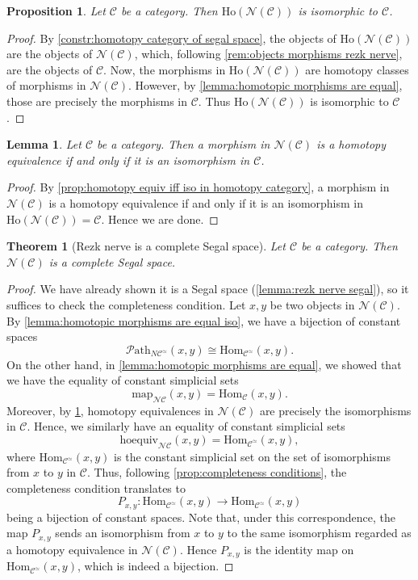 \documentclass[11pt, a4paper]{amsart}
\newcommand{\cC}{\mathcal{C}}
\newcommand{\sN}{\mathscr{N}}
\newcommand{\Hom}{\mathrm{Hom}}
\newcommand{\map}{\mathrm{map}}
\newcommand{\Ho}{\mathrm{Ho}}
\newcommand{\hoequiv}{\mathrm{hoequiv}}
\newcommand{\Path}{\mathscr{P}\mathrm{ath}}
\newtheorem{theorem}[equation]{Theorem}
\newtheorem{lemma}[equation]{Lemma}
\newtheorem{proposition}[equation]{Proposition}
\theoremstyle{definition}
\theoremstyle{remark}
\numberwithin{equation}{section}
\begin{document}
\begin{proposition}
  Let $\cC$ be a category. Then $\Ho(\sN(\cC))$ is isomorphic to $\cC$.
\end{proposition}

\begin{proof}
  By \cref{constr:homotopy category of segal space}, the objects of $\Ho(\sN(\cC))$ are the objects of $\sN(\cC)$, which, following \cref{rem:objects morphisms rezk nerve}, are the objects of $\cC$. Now, the morphisms in $\Ho(\sN(\cC))$ are homotopy classes of morphisms in $\sN(\cC)$. However, by \cref{lemma:homotopic morphisms are equal}, those are precisely the morphisms in $\cC$. Thus $\Ho(\sN(\cC))$ is isomorphic to $\cC$.
\end{proof}

\begin{lemma} \label{lemma:equivalences in rezk nerve}
  Let $\cC$ be a category. Then a morphism in $\sN(\cC)$ is a homotopy equivalence if and only if it is an isomorphism in $\cC$.
\end{lemma}

\begin{proof}
 By \cref{prop:homotopy equiv iff iso in homotopy category}, a morphism in $\sN(\cC)$ is a homotopy equivalence if and only if it is an isomorphism in $\Ho(\sN(\cC)) = \cC$. Hence we are done.
\end{proof}

\begin{theorem}[Rezk nerve is a complete Segal space]
  Let $\cC$ be a category. Then $\sN(\cC)$ is a complete Segal space.
\end{theorem}

\begin{proof}
  We have already shown it is a Segal space (\cref{lemma:rezk nerve segal}), so it suffices to check the completeness condition.   Let $x,y$ be two objects in $\sN(\cC)$. By \cref{lemma:homotopic morphisms are equal iso}, we have a bijection of constant spaces
  \[\Path_{N\cC^\simeq}(x,y) \cong \Hom_{\cC^\simeq}(x,y).\]
  On the other hand, in \cref{lemma:homotopic morphisms are equal}, we showed that we have the equality of constant simplicial sets
  \[\map_{\sN\cC}(x,y) = \Hom_{\cC}(x,y). \]
  Moreover, by \cref{lemma:equivalences in rezk nerve}, homotopy equivalences in $\sN(\cC)$ are precisely the isomorphisms in $\cC$. Hence, we similarly have an equality of constant simplicial sets 
   \[\hoequiv_{\sN\cC}(x,y) = \Hom_{\cC^\simeq}(x,y),\]
   where $\Hom_{\cC^\simeq}(x,y)$ is the constant simplicial set on the set of isomorphisms from $x$ to $y$ in $\cC$. Thus, following \cref{prop:completeness conditions}, the completeness condition translates to 
   \[P_{x,y}\colon\Hom_{\cC^\simeq}(x,y) \to \Hom_{\cC^\simeq}(x,y)\]
    being a bijection of constant spaces. Note that, under this correspondence, the map \(P_{x,y}\) sends an isomorphism from $x$ to $y$ to the same isomorphism regarded as a homotopy equivalence in $\sN(\cC)$. Hence $P_{x,y}$ is the identity map on \(\Hom_{\cC^\simeq}(x,y)\), which is indeed a bijection.
\end{proof}
\end{document}
